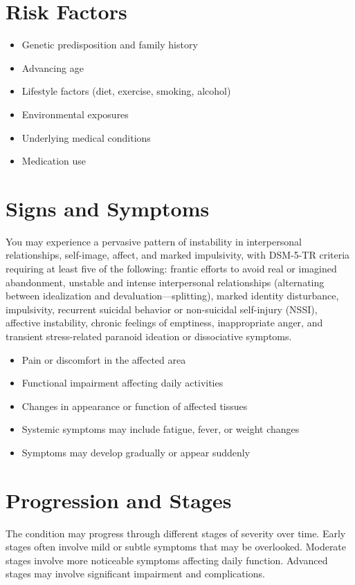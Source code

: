 \section{Risk Factors}
\begin{itemize}[noitemsep]
  \item Genetic predisposition and family history
  \item Advancing age
  \item Lifestyle factors (diet, exercise, smoking, alcohol)
  \item Environmental exposures
  \item Underlying medical conditions
  \item Medication use
\end{itemize}
\section{Signs and Symptoms}
You may experience a pervasive pattern of instability in interpersonal relationships, self-image, affect, and marked impulsivity, with DSM-5-TR criteria requiring at least five of the following: frantic efforts to avoid real or imagined abandonment, unstable and intense interpersonal relationships (alternating between idealization and devaluation---splitting), marked identity disturbance, impulsivity, recurrent suicidal behavior or non-suicidal self-injury (NSSI), affective instability, chronic feelings of emptiness, inappropriate anger, and transient stress-related paranoid ideation or dissociative symptoms.

\begin{itemize}[noitemsep]
  \item Pain or discomfort in the affected area
  \item Functional impairment affecting daily activities
  \item Changes in appearance or function of affected tissues
  \item Systemic symptoms may include fatigue, fever, or weight changes
  \item Symptoms may develop gradually or appear suddenly
\end{itemize}
\section{Progression and Stages}
The condition may progress through different stages of severity over time. Early stages often involve mild or subtle symptoms that may be overlooked. Moderate stages involve more noticeable symptoms affecting daily function. Advanced stages may involve significant impairment and complications.
